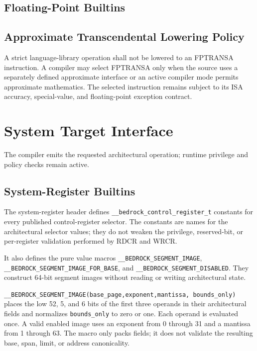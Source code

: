 \documentclass[10pt,twoside]{article}
\begin{document}
\subsection{Floating-Point Builtins}


\subsection{Approximate Transcendental Lowering Policy}
A strict language-library operation shall not be lowered to an FPTRANSA
instruction. A compiler may select FPTRANSA only when the source uses a
separately defined approximate interface or an active compiler mode permits
approximate mathematics. The selected instruction remains subject to its ISA
accuracy, special-value, and floating-point exception contract.

\section{System Target Interface}\label{page:system-target-interface}
The compiler emits the requested architectural operation; runtime privilege and policy checks
remain active.

\subsection{System-Register Builtins}


The system-register header defines \texttt{\_\_bedrock\_control\_register\_t} constants for every published
control-register selector. The constants are names for the architectural selector values; they do not weaken the
privilege, reserved-bit, or per-register validation performed by RDCR and WRCR.

It also defines the pure value macros
\texttt{\_\allowbreak{}\_\allowbreak{}BEDROCK\_\allowbreak{}SEGMENT\_\allowbreak{}IMAGE},
\texttt{\_\allowbreak{}\_\allowbreak{}BEDROCK\_\allowbreak{}SEGMENT\_\allowbreak{}IMAGE\_\allowbreak{}FOR\_\allowbreak{}BASE}, and
\texttt{\_\allowbreak{}\_\allowbreak{}BEDROCK\_\allowbreak{}SEGMENT\_\allowbreak{}DISABLED}. They construct 64-bit segment
images without reading or writing architectural state.

\texttt{\_\_BEDROCK\_SEGMENT\_IMAGE(base\_page,exponent,mantissa,
bounds\_only)} places the low 52, 5, and 6 bits of the first three operands in
their architectural fields and normalizes \texttt{bounds\_only} to zero or
one. Each operand is evaluated once. A valid enabled image uses an exponent
from 0 through 31 and a mantissa from 1 through 63. The macro only packs
fields; it does not validate the resulting base, span, limit, or address
canonicality.
\end{document}
